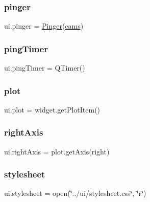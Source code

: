 \mbox{\label{namespaceui_ad6a1f0cb59203283f1891267696aaf6e}} 
\subsubsection{\texorpdfstring{pinger}{pinger}}
{\footnotesize\ttfamily ui.\+pinger = \hyperlink{classui_1_1_pinger}{Pinger}(\hyperlink{namespaceui_a8e2392b67718029c7ae06c8e4f79b9dc}{cams})}

\mbox{\label{namespaceui_a413340b69ea8a36f526ef691e1287f2c}} 
\subsubsection{\texorpdfstring{ping\+Timer}{pingTimer}}
{\footnotesize\ttfamily ui.\+ping\+Timer = Q\+Timer()}

\mbox{\label{namespaceui_a45f8c2fae5eb64cd2de3091bd3fc3ca8}} 
\subsubsection{\texorpdfstring{plot}{plot}}
{\footnotesize\ttfamily ui.\+plot = widget.\+get\+Plot\+Item()}

\mbox{\label{namespaceui_a0f719593f62467929abfbb1db46530a9}} 
\subsubsection{\texorpdfstring{right\+Axis}{rightAxis}}
{\footnotesize\ttfamily ui.\+right\+Axis = plot.\+get\+Axis(\textquotesingle{}right\textquotesingle{})}

\mbox{\label{namespaceui_a622dff979fe009d0b7a0b5065a48eeb4}} 
\subsubsection{\texorpdfstring{stylesheet}{stylesheet}}
{\footnotesize\ttfamily ui.\+stylesheet = open(\char`\"{}../ui/stylesheet.\+css\char`\"{}, \char`\"{}r\char`\"{})}

